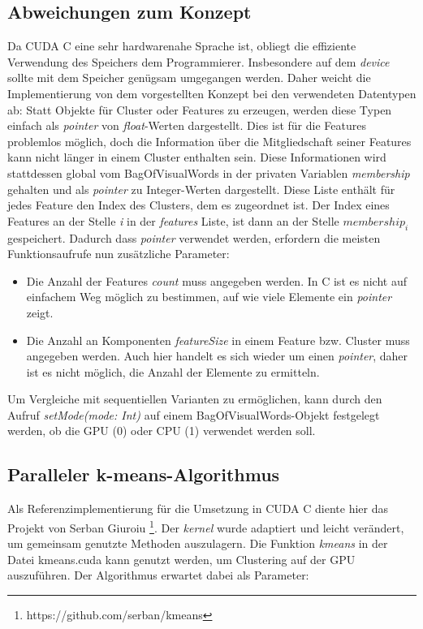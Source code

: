 \subsection{Abweichungen zum Konzept}

Da CUDA C eine sehr hardwarenahe Sprache ist, obliegt die effiziente Verwendung des Speichers dem Programmierer. Insbesondere auf dem \textit{device} sollte mit dem Speicher genügsam umgegangen werden. Daher weicht die Implementierung von dem vorgestellten Konzept bei den verwendeten Datentypen ab: Statt Objekte für Cluster oder Features zu erzeugen, werden diese Typen einfach als \textit{pointer} von \textit{float}-Werten dargestellt. Dies ist für die Features problemlos möglich, doch die Information über die Mitgliedschaft seiner Features kann nicht länger in einem Cluster enthalten sein. Diese Informationen wird stattdessen global vom BagOfVisualWords in der privaten Variablen \textit{membership} gehalten und als \textit{pointer} zu Integer-Werten dargestellt. Diese Liste enthält für jedes Feature den Index des Clusters, dem es zugeordnet ist. Der Index eines Features an der Stelle \textit{i} in der \textit{features} Liste, ist dann an der Stelle $membership_i$ gespeichert.\newline
Dadurch dass \textit{pointer} verwendet werden, erfordern die meisten Funktionsaufrufe nun zusätzliche Parameter: 

\begin{itemize}
	\item Die Anzahl der Features \textit{count} muss angegeben werden. In C ist es nicht auf einfachem Weg möglich zu bestimmen, auf wie viele Elemente ein \textit{pointer} zeigt.
	\item Die Anzahl an Komponenten \textit{featureSize} in einem Feature bzw. Cluster muss angegeben werden. Auch hier handelt es sich wieder um einen \textit{pointer}, daher ist es nicht möglich, die Anzahl der Elemente zu ermitteln.
\end{itemize}

Um Vergleiche mit sequentiellen Varianten zu ermöglichen, kann durch den Aufruf \textit{setMode(mode: Int)} auf einem BagOfVisualWords-Objekt festgelegt werden, ob die GPU (0) oder CPU (1) verwendet werden soll.

\subsection{Paralleler k-means-Algorithmus}

Als Referenzimplementierung für die Umsetzung in CUDA C diente hier das Projekt von Serban Giuroiu \footnote{https://github.com/serban/kmeans}. Der \textit{kernel} wurde adaptiert und leicht verändert, um gemeinsam genutzte Methoden auszulagern. Die Funktion \textit{kmeans} in der Datei kmeans.cuda kann genutzt werden, um Clustering auf der GPU auszuführen. Der Algorithmus erwartet dabei als Parameter:

